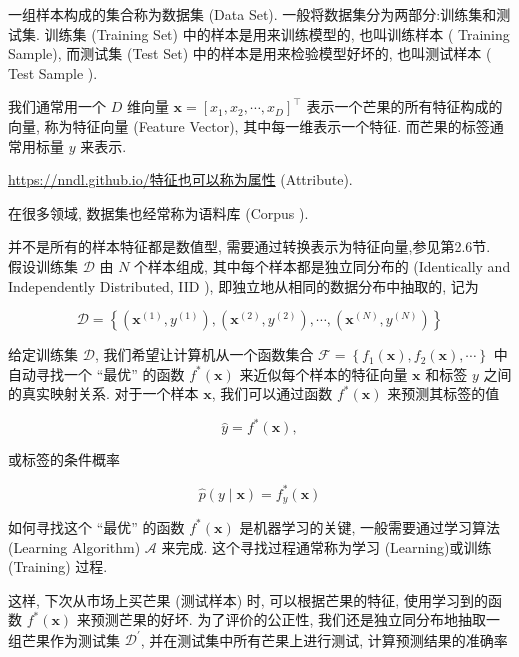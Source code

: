 \documentclass[10pt]{article}
\begin{document}
一组样本构成的集合称为数据集 (Data Set). 一般将数据集分为两部分:训练集和测试集. 训练集 (Training Set) 中的样本是用来训练模型的, 也叫训练样本 ( Training Sample), 而测试集 (Test Set) 中的样本是用来检验模型好坏的, 也叫测试样本 ( Test Sample ).

我们通常用一个 $D$ 维向量 $\boldsymbol{x}=\left[x_{1}, x_{2}, \cdots, x_{D}\right]^{\top}$ 表示一个芒果的所有特征构成的向量, 称为特征向量 (Feature Vector), 其中每一维表示一个特征. 而芒果的标签通常用标量 $y$ 来表示.

\href{https://nndl.github.io/%E7%89%B9%E5%BE%81%E4%B9%9F%E5%8F%AF%E4%BB%A5%E7%A7%B0%E4%B8%BA%E5%B1%9E%E6%80%A7}{https://nndl.github.io/特征也可以称为属性} (Attribute).

在很多领域, 数据集也经常称为语料库 (Corpus ).

并不是所有的样本特征都是数值型, 需要通过转换表示为特征向量,参见第2.6节.\\
假设训练集 $\mathcal{D}$ 由 $N$ 个样本组成, 其中每个样本都是独立同分布的 (Identically and Independently Distributed, IID ), 即独立地从相同的数据分布中抽取的, 记为


\begin{equation*}
\mathcal{D}=\left\{\left(\boldsymbol{x}^{(1)}, y^{(1)}\right),\left(\boldsymbol{x}^{(2)}, y^{(2)}\right), \cdots,\left(\boldsymbol{x}^{(N)}, y^{(N)}\right)\right\} \tag{2.1}
\end{equation*}


给定训练集 $\mathcal{D}$, 我们希望让计算机从一个函数集合 $\mathcal{F}=\left\{f_{1}(\boldsymbol{x}), f_{2}(\boldsymbol{x}), \cdots\right\}$ 中自动寻找一个 “最优” 的函数 $f^{*}(\boldsymbol{x})$ 来近似每个样本的特征向量 $\boldsymbol{x}$ 和标签 $y$ 之间的真实映射关系. 对于一个样本 $\boldsymbol{x}$, 我们可以通过函数 $f^{*}(\boldsymbol{x})$ 来预测其标签的值


\begin{equation*}
\hat{y}=f^{*}(\boldsymbol{x}), \tag{2.2}
\end{equation*}


或标签的条件概率


\begin{equation*}
\hat{p}(y \mid \boldsymbol{x})=f_{y}^{*}(\boldsymbol{x}) \tag{2.3}
\end{equation*}


如何寻找这个 “最优” 的函数 $f^{*}(\boldsymbol{x})$ 是机器学习的关键, 一般需要通过学习算法 (Learning Algorithm) $\mathcal{A}$ 来完成. 这个寻找过程通常称为学习 (Learning)或训练 (Training) 过程.

这样, 下次从市场上买芒果 (测试样本) 时, 可以根据芒果的特征, 使用学习到的函数 $f^{*}(\boldsymbol{x})$ 来预测芒果的好坏. 为了评价的公正性, 我们还是独立同分布地抽取一组芒果作为测试集 $\mathcal{D}^{\prime}$, 并在测试集中所有芒果上进行测试, 计算预测结果的准确率
\end{document}

